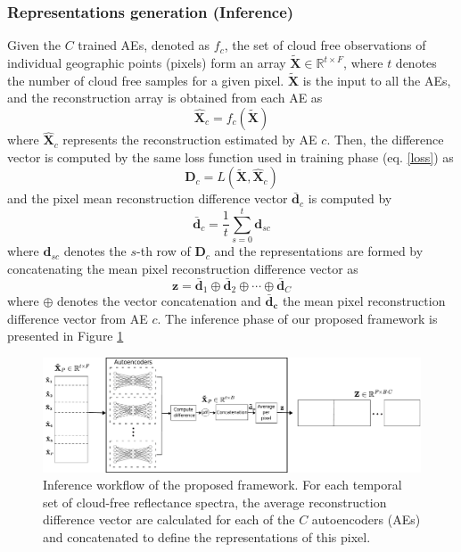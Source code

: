 \documentclass[journal,article,submit,pdftex,moreauthors]{Definitions/mdpi}
\begin{document}
\subsubsection{Representations generation (Inference)}
Given the $C$ trained \ac{AEs}, denoted as $f_c$, the set of cloud free observations of individual geographic points (pixels) form an array $\mathbf{\tilde{X}} \in \mathbb{R}^{t \times F}$, where $t$ denotes the number of cloud free samples for a given pixel. $\mathbf{\tilde{X}}$ is the input to all the \ac{AEs}, and the reconstruction array is obtained from each AE as
\begin{equation}
	\mathbf{\hat{X}}_c = f_c(\mathbf{\tilde{X}}) 
\end{equation}
where $\mathbf{\hat{X}}_c$ represents the reconstruction estimated by AE $c$. Then, the difference vector is computed by the same loss function used in training phase (eq. \ref{loss}) as
\begin{equation}
    \mathbf{D}_c = L(\mathbf{\tilde{X}}, \mathbf{\hat{X}}_c)
\end{equation}
and the pixel mean reconstruction difference vector $\mathbf{\bar{d}}_c$ is computed by
\begin{equation}
	\mathbf{\bar{d}}_c = \frac{1}{t}\sum_{s=0}^{t}\mathbf{d}_{sc}
\end{equation} 
where $\mathbf{d}_{sc}$ denotes the $s$-th row of $\mathbf{D}_c$ and the representations are formed by concatenating the mean pixel reconstruction difference vector as
\begin{equation}
    \mathbf{z}=\mathbf{\bar{d}}_1 \oplus \mathbf{\bar{d}}_2 \oplus \cdots \oplus \mathbf{\bar{d}}_C
\end{equation}
where $\oplus$ denotes the vector concatenation and $\mathbf{\bar{d}_c}$ the mean pixel reconstruction difference vector from AE $c$.
The inference phase of our proposed framework is presented in Figure \ref{Inference}
\begin{figure}[H]
	\centering
	\includegraphics[width=\textwidth]{figures/testing.pdf}
	\caption{Inference workflow of the proposed framework. For each temporal set of cloud-free reflectance spectra, the average reconstruction difference vector are calculated for each of the $C$ autoencoders (AEs) and concatenated to define the representations of this pixel.}
	\label{Inference}    
\end{figure}
\end{document}
